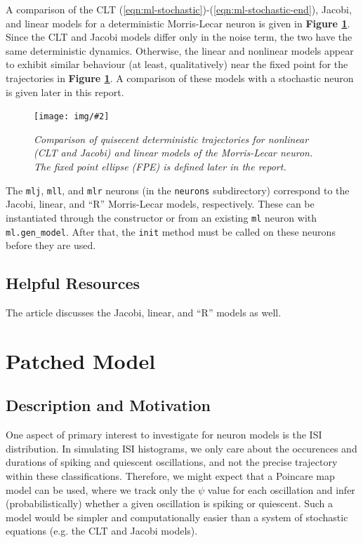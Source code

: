 \documentclass[letterpaper,12pt]{article}
\numberwithin{table}{section}
\numberwithin{figure}{section}
\numberwithin{equation}{section}
\newcommand{\centerfig}[2]{\begin{center}\texttt{[image: img/\#2]}\end{center}}
\newcommand{\ccaption}[1]{\caption{\textit{#1}}}
\newcommand{\reffig}[1]{\textbf{Figure \ref{#1}}}
\begin{document}
\begin{flushleft}
    A comparison of the CLT (\ref{eqn:ml-stochastic})-(\ref{eqn:ml-stochastic-end}), Jacobi, and linear models for a deterministic Morris-Lecar neuron is given in \reffig{fig:det-comp}. Since the CLT and Jacobi models differ only in the noise term, the two have the same deterministic dynamics. Otherwise, the linear and nonlinear models appear to exhibit similar behaviour (at least, qualitatively) near the fixed point for the trajectories in \reffig{fig:det-comp}. A comparison of these models with a stochastic neuron is given later in this report.
    \begin{figure}[h]

        \centering
 
        \centerfig{0.8}{det-comp.jpg}
    
        \captionsetup{width=0.85\linewidth}
        \ccaption{Comparison of quisecent deterministic trajectories for nonlinear (CLT and Jacobi) and linear models of the Morris-Lecar neuron. The fixed point ellipse (FPE) is defined later in the report.}
        \label{fig:det-comp}
    
    \end{figure}

    The \texttt{mlj}, \texttt{mll}, and \texttt{mlr} neurons (in the \texttt{neurons} subdirectory) correspond to the Jacobi, linear, and ``R'' Morris-Lecar models, respectively. These can be instantiated through the constructor or from an existing \texttt{ml} neuron with \texttt{ml.gen\_model}. After that, the \texttt{init} method must be called on these neurons before they are used.

    \subsection{Helpful Resources}
    The article \cite{dg} discusses the Jacobi, linear, and ``R'' models as well.

    \pagebreak

    \section{Patched Model}

    \subsection{Description and Motivation}

    One aspect of primary interest to investigate for neuron models is the ISI distribution. In simulating ISI histograms, we only care about the occurences and durations of spiking and quiescent oscillations, and not the precise trajectory within these classifications. Therefore, we might expect that a Poincare map model can be used, where we track only the $\psi$ value for each oscillation and infer (probabilistically) whether a given oscillation is spiking or quiescent. Such a model would be simpler and computationally easier than a system of stochastic equations (e.g. the CLT and Jacobi models).


\end{flushleft}
\end{document}
